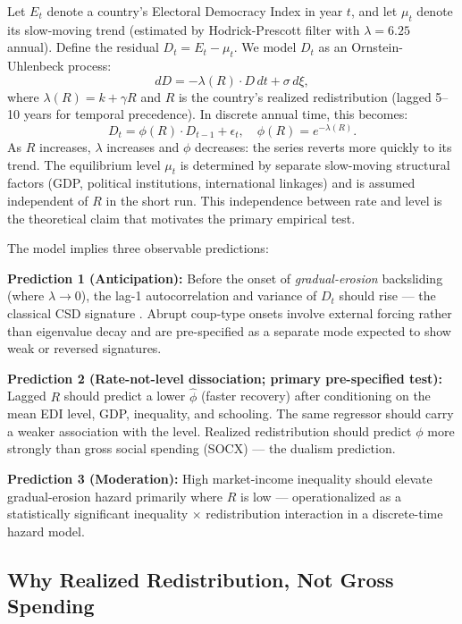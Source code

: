 \documentclass[11pt,letterpaper]{article}
\begin{document}
Let $E_t$ denote a country's Electoral Democracy Index in year $t$, and let $\mu_t$ denote its slow-moving trend
(estimated by Hodrick-Prescott filter with $\lambda = 6.25$ annual). Define the residual $D_t = E_t - \mu_t$. We model
$D_t$ as an Ornstein-Uhlenbeck process:
\begin{equation}
  dD = -\lambda(R) \cdot D\,dt + \sigma\,d\xi,
\end{equation}
where $\lambda(R) = k + \gamma R$ and $R$ is the country's realized redistribution (lagged 5--10 years for temporal
precedence). In discrete annual time, this becomes:
\begin{equation}
  D_t = \phi(R) \cdot D_{t-1} + \epsilon_t, \quad \phi(R) = e^{-\lambda(R)}.
\end{equation}
As $R$ increases, $\lambda$ increases and $\phi$ decreases: the series reverts more quickly to its trend. The
equilibrium level $\mu_t$ is determined by separate slow-moving structural factors (GDP, political institutions,
international linkages) and is assumed independent of $R$ in the short run. This independence between rate and level is
the theoretical claim that motivates the primary empirical test.

The model implies three observable predictions:

\textbf{Prediction 1 (Anticipation):} Before the onset of \emph{gradual-erosion} backsliding (where $\lambda \to 0$),
the lag-1 autocorrelation and variance of $D_t$ should rise --- the classical CSD signature
\citep{Scheffer2009,Scheffer2012}. Abrupt coup-type onsets involve external forcing rather than eigenvalue decay and
are pre-specified as a separate mode expected to show weak or reversed signatures.

\textbf{Prediction 2 (Rate-not-level dissociation; primary pre-specified test):} Lagged $R$ should predict a lower
$\hat{\phi}$ (faster recovery) after conditioning on the mean EDI level, GDP, inequality, and schooling. The same
regressor should carry a weaker association with the level. Realized redistribution should predict $\phi$ more strongly
than gross social spending (SOCX) --- the dualism prediction.

\textbf{Prediction 3 (Moderation):} High market-income inequality should elevate gradual-erosion hazard primarily where
$R$ is low --- operationalized as a statistically significant inequality $\times$ redistribution interaction in a
discrete-time hazard model.

\subsection{Why Realized Redistribution, Not Gross Spending}
\end{document}
